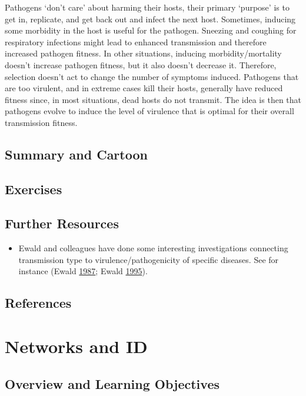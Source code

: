 \documentclass[]{book}
\providecommand{\tightlist}{%
  \setlength{\itemsep}{0pt}\setlength{\parskip}{0pt}}
\theoremstyle{definition}
\theoremstyle{definition}
\theoremstyle{definition}
\theoremstyle{remark}
\begin{document}
Pathogens `don't care' about harming their hosts, their primary
`purpose' is to get in, replicate, and get back out and infect the next
host. Sometimes, inducing some morbidity in the host is useful for the
pathogen. Sneezing and coughing for respiratory infections might lead to
enhanced transmission and therefore increased pathogen fitness. In other
situations, inducing morbidity/mortality doesn't increase pathogen
fitness, but it also doesn't decrease it. Therefore, selection doesn't
act to change the number of symptoms induced. Pathogens that are too
virulent, and in extreme cases kill their hosts, generally have reduced
fitness since, in most situations, dead hosts do not transmit. The idea
is then that pathogens evolve to induce the level of virulence that is
optimal for their overall transmission fitness.

\section{Summary and Cartoon}\label{summary-and-cartoon-16}

\section{Exercises}\label{exercises-16}

\section{Further Resources}\label{further-resources-16}

\begin{itemize}
\tightlist
\item
  Ewald and colleagues have done some interesting investigations
  connecting transmission type to virulence/pathogenicity of specific
  diseases. See for instance (Ewald
  \protect\hyperlink{ref-ewald87}{1987}; Ewald
  \protect\hyperlink{ref-ewald95}{1995}).
\end{itemize}

\section{References}\label{references-17}

\chapter{Networks and ID}\label{networks-and-id}

\section{Overview and Learning
Objectives}\label{overview-and-learning-objectives-17}
\end{document}
